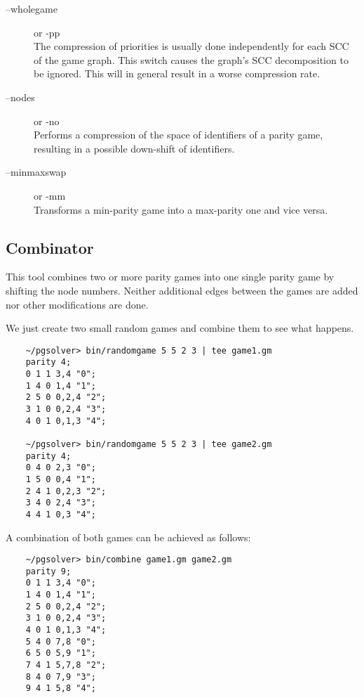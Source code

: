 \begin{description}
\item[{\ttfamily --wholegame}] \enspace or {\ttfamily -pp} \\
    The compression of priorities is usually done independently for each SCC of the game graph.
    This switch causes the graph's SCC decomposition to be ignored. This will in general result
    in a worse compression rate.

\item[{\ttfamily --nodes}] \enspace or {\ttfamily -no} \\
    Performs a compression of the space of identifiers of a parity game, resulting in a possible
    down-shift of identifiers.

\item[{\ttfamily --minmaxswap}] \enspace or {\ttfamily -mm} \\
    Transforms a min-parity game into a max-parity one and vice versa.
\end{description}


\subsection{Combinator}

This tool combines two or more parity games into one single parity game by shifting the node numbers.
Neither additional edges between the games are added nor other modifications are done.

\begin{example}
We just create two small random games and combine them to see what happens.
\begin{verbatim}
    ~/pgsolver> bin/randomgame 5 5 2 3 | tee game1.gm
    parity 4;
    0 1 1 3,4 "0";
    1 4 0 1,4 "1";
    2 5 0 0,2,4 "2";
    3 1 0 0,2,4 "3";
    4 0 1 0,1,3 "4";

    ~/pgsolver> bin/randomgame 5 5 2 3 | tee game2.gm
    parity 4;
    0 4 0 2,3 "0";
    1 5 0 0,4 "1";
    2 4 1 0,2,3 "2";
    3 4 0 2,4 "3";
    4 4 1 0,3 "4";
\end{verbatim}
A combination of both games can be achieved as follows:
\begin{verbatim}
    ~/pgsolver> bin/combine game1.gm game2.gm
    parity 9;
    0 1 1 3,4 "0";
    1 4 0 1,4 "1";
    2 5 0 0,2,4 "2";
    3 1 0 0,2,4 "3";
    4 0 1 0,1,3 "4";
    5 4 0 7,8 "0";
    6 5 0 5,9 "1";
    7 4 1 5,7,8 "2";
    8 4 0 7,9 "3";
    9 4 1 5,8 "4";
\end{verbatim}
\end{example}

